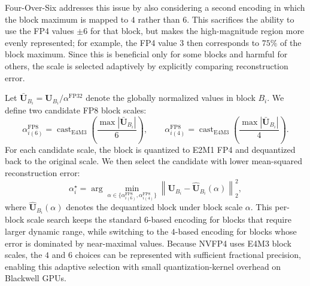 \documentclass{llmxive}
\begin{document}
Four-Over-Six addresses this issue by also considering a second encoding in which the block maximum is mapped to $4$ rather than $6$. This sacrifices the ability to use the FP4 values $\pm6$ for that block, but makes the high-magnitude region more evenly represented; for example, the FP4 value $3$ then corresponds to $75\%$ of the block maximum. Since this is beneficial only for some blocks and harmful for others, the scale is selected adaptively by explicitly comparing reconstruction error.

Let $\bar{\mathbf{U}}_{B_i} = \mathbf{U}_{B_i} / \alpha^{\text{FP32}}$ denote the globally normalized values in block $B_i$. We define two candidate FP8 block scales:
\begin{equation}
    \alpha^{\text{FP8}}_{i(6)} =
    \operatorname{cast}_{\mathrm{E4M3}}\!\left(
    \frac{\operatorname{max}|\bar{\mathbf{U}}_{B_i}|}{6}
    \right),\qquad
    \alpha^{\text{FP8}}_{i(4)} =
    \operatorname{cast}_{\mathrm{E4M3}}\!\left(
    \frac{\operatorname{max}|\bar{\mathbf{U}}_{B_i}|}{4}
    \right).
\end{equation}
For each candidate scale, the block is quantized to E2M1 FP4 and dequantized back to the original scale. We then select the candidate with lower mean-squared reconstruction error:
\begin{equation}\label{eq:4o6}
\alpha_i^\star=\arg\min_{\alpha \in \{\alpha^{\text{FP8}}_{i(6)}, \alpha^{\text{FP8}}_{i(4)}\}}
\left\|
\mathbf{U}_{B_i} - \hat{\mathbf{U}}_{B_i}(\alpha)
\right\|_2^2,
\end{equation}
where $\hat{\mathbf{U}}_{B_i}(\alpha)$ denotes the dequantized block under block scale $\alpha$. This per-block scale search keeps the standard $6$-based encoding for blocks that require larger dynamic range, while switching to the $4$-based encoding for blocks whose error is dominated by near-maximal values. Because NVFP4 uses E4M3 block scales, the $4$ and $6$ choices can be represented with sufficient fractional precision, enabling this adaptive selection with small quantization-kernel overhead on Blackwell GPUs.
\end{document}
